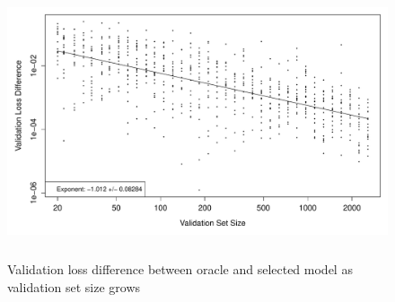 \documentclass[12pt]{article}
\begin{document}

\begin{figure}
\label{fig:emp_v_theory}
\caption{
	Validation loss difference between oracle and selected model as validation set size grows
}
\centering
\includegraphics[height=80mm]{../R/figures/validation_size_loss_diff.pdf}
\end{figure}
\end{document}
